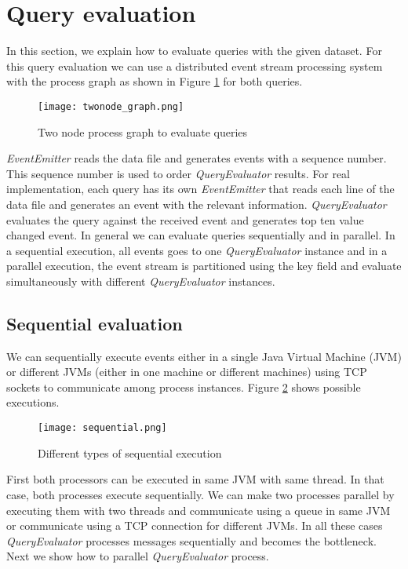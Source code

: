 \section{Query evaluation}

In this section, we explain how to evaluate queries with the given dataset. For this query evaluation we can use a distributed event stream processing system with the process graph as shown in Figure \ref{twonode_graph} for both queries.

\begin{figure}[!t]
        \centering
        \texttt{[image: twonode\_graph.png]}
        \caption{Two node process graph to evaluate queries}
        \label{twonode_graph}
\end{figure}

\textit{EventEmitter} reads the data file and generates events with a sequence number. This sequence number is used to order \textit{QueryEvaluator} results. For real implementation, each query has its own \textit{EventEmitter} that reads each line of the data file and generates an event with the relevant information. \textit{QueryEvaluator} evaluates the query against the received event and generates top ten value changed event.  In general we can evaluate queries sequentially and in parallel. In a sequential execution, all events goes to one \textit{QueryEvaluator} instance and in a parallel execution, the event stream is partitioned using the key field and evaluate simultaneously with different \textit{QueryEvaluator} instances.

\subsection{Sequential evaluation}

We can sequentially execute events either in a single Java Virtual Machine (JVM) or different JVMs (either in one machine or different machines) using TCP sockets to communicate among process instances. Figure \ref{sequential} shows possible executions. 

\begin{figure}[!t]
        \centering
        \texttt{[image: sequential.png]}
        \caption{Different types of sequential execution}
        \label{sequential}
\end{figure}

First both processors can be executed in same JVM with same thread. In that case, both processes execute sequentially. We can make two processes parallel by executing them with two threads and communicate using a queue in same JVM or communicate using a TCP connection for different JVMs. In all these cases \textit{QueryEvaluator} processes messages sequentially and becomes the bottleneck. Next we show how to parallel \textit{QueryEvaluator} process. 

